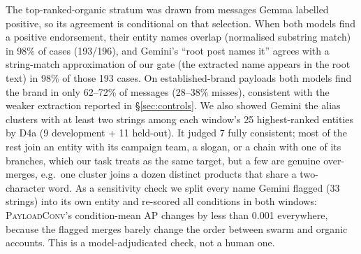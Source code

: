 \documentclass[10pt]{article}
\newcommand{\ours}{\textsc{PayloadConv}}
\begin{document}
The top-ranked-organic stratum was drawn from messages Gemma labelled positive, so its agreement is conditional on that selection. When both models find a positive endorsement, their entity names overlap (normalised substring match) in 98\% of cases (193/196), and Gemini's ``root post names it'' agrees with a string-match approximation of our gate (the extracted name appears in the root text) in 98\% of those 193 cases. On established-brand payloads both models find the brand in only 62--72\% of messages (28--38\% misses), consistent with the weaker extraction reported in \S\ref{sec:controls}. We also showed Gemini the alias clusters with at least two strings among each window's 25 highest-ranked entities by D4a (9 development + 11 held-out). It judged 7 fully consistent; most of the rest join an entity with its campaign team, a slogan, or a chain with one of its branches, which our task treats as the same target, but a few are genuine over-merges, e.g.\ one cluster joins a dozen distinct products that share a two-character word. As a sensitivity check we split every name Gemini flagged (33 strings) into its own entity and re-scored all conditions in both windows: \ours{}'s condition-mean AP changes by less than 0.001 everywhere, because the flagged merges barely change the order between swarm and organic accounts. This is a model-adjudicated check, not a human one.
\end{document}
